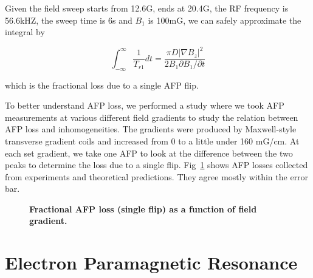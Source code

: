 Given the field sweep starts from 12.6G, ends at 20.4G, the RF frequency is 56.6kHZ, the sweep time is 6s and $B_{1}$ is 100mG, we can safely approximate the integral by 

\begin{equation}
\int_{-\infty}^{\infty} \frac{1}{T_{r1}}dt=\frac{\pi D|\nabla B_{z}|^{2}}{2B_{1}\partial B_{1}/\partial t}
\end{equation}

which is the fractional loss due to a single AFP flip.

To better understand AFP loss, we performed a study where we took AFP measurements at various different field gradients to study the relation between AFP loss and inhomogeneities. The gradients were produced by Maxwell-style transverse gradient coils and increased from 0 to a little under 160 mG/cm. At each set gradient, we take one AFP to look at the difference between the two peaks to determine the loss due to a single flip. Fig~\ref{AFPLossvsGradient} shows AFP losses collected from experiments and theoretical predictions. They agree mostly within the error bar.

\begin{figure}[H]
	\centering
	\caption{{\bf Fractional AFP loss (single flip) as a function of field gradient.}}
	\label{AFPLossvsGradient}
\end{figure}

\section{Electron Paramagnetic Resonance}

